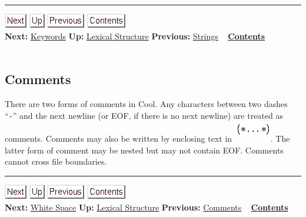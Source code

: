 \documentclass[]{article}
\begin{document}
\begin{center}\rule{3in}{0.4pt}\end{center}

\href{node37.html}{\includegraphics{next.png}}
\href{node33.html}{\includegraphics{up.png}}
\href{node35.html}{\includegraphics{prev.png}}
\href{node1.html}{\includegraphics{contents.png}} \\ \textbf{Next:}
\href{node37.html}{Keywords} \textbf{Up:} \href{node33.html}{Lexical
Structure} \textbf{Previous:} \href{node35.html}{Strings} ~
\textbf{\href{node1.html}{Contents}} \\ \\

\subsection{Comments}

There are two forms of comments in Cool. Any characters between two
dashes ``\texttt{-}'' and the next newline (or EOF, if there is no next
newline) are treated as comments. Comments may also be written by
enclosing text in \includegraphics{img37.png}. The latter form of
comment may be nested but may not contain EOF. Comments cannot cross
file boundaries.

\begin{center}\rule{3in}{0.4pt}\end{center}

\href{node38.html}{\includegraphics{next.png}}
\href{node33.html}{\includegraphics{up.png}}
\href{node36.html}{\includegraphics{prev.png}}
\href{node1.html}{\includegraphics{contents.png}} \\ \textbf{Next:}
\href{node38.html}{White Space} \textbf{Up:} \href{node33.html}{Lexical
Structure} \textbf{Previous:} \href{node36.html}{Comments} ~
\textbf{\href{node1.html}{Contents}} \\ \\
\end{document}
